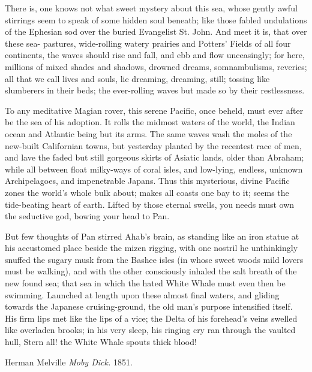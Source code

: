 \documentclass{article}
\begin{document}
   There is, one knows not what sweet mystery about this sea, whose gently awful stirrings seem to speak of some hidden soul beneath; like those fabled undulations of the Ephesian sod over the buried Evangelist St. John. And meet it is, that over these sea- pastures, wide-rolling watery prairies and Potters' Fields of all four continents, the waves should rise and fall, and ebb and flow unceasingly; for here, millions of mixed shades and shadows, drowned dreams, somnambulisms, reveries; all that we call lives and souls, lie dreaming, dreaming, still; tossing like slumberers in their beds; the ever-rolling waves but made so by their restlessness.

   To any meditative Magian rover, this serene Pacific, once beheld, must ever after be the sea of his adoption. It rolls the midmost waters of the world, the Indian ocean and Atlantic being but its arms. The same waves wash the moles of the new-built Californian towns, but yesterday planted by the recentest race of men, and lave the faded but still gorgeous skirts of Asiatic lands, older than Abraham; while all between float milky-ways of coral isles, and low-lying, endless, unknown Archipelagoes, and impenetrable Japans. Thus this mysterious, divine Pacific zones the world's whole bulk about; makes all coasts one bay to it; seems the tide-beating heart of earth. Lifted by those eternal swells, you needs must own the seductive god, bowing your head to Pan.

   But few thoughts of Pan stirred Ahab's brain, as standing like an iron statue at his accustomed place beside the mizen
rigging, with one nostril he unthinkingly snuffed the sugary musk from the Bashee isles (in whose sweet woods mild lovers must be walking), and with the other consciously inhaled the salt breath of the new found sea; that sea in which the hated White Whale must even then be swimming. Launched at length upon these almost final waters, and gliding towards the Japanese cruising-ground, the old man's purpose intensified itself. His firm lips met like the lips of a vice; the Delta of his forehead's veins swelled like overladen brooks; in his very sleep, his ringing cry ran through the vaulted hull, Stern all! the White Whale spouts thick blood! 



\begin{thebibliography}{1}

     Herman Melville {\em Moby Dick.} 1851.

\end{thebibliography}
\end{document}

